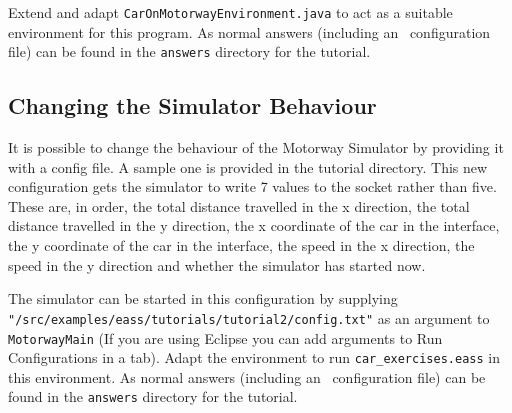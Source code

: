 Extend and adapt \texttt{CarOnMotorwayEnvironment.java} to act as a suitable environment for this program.  As normal answers (including an \ail\ configuration file) can be found in the \texttt{answers} directory for the tutorial.

\subsection{Changing the Simulator Behaviour}
It is possible to change the behaviour of the Motorway Simulator by providing it with a config file.  A sample one is provided in the tutorial directory.  This new configuration gets the simulator to write 7 values to the socket rather than five.  These are, in order, the total distance travelled in the x direction, the total distance travelled in the y direction, the x coordinate of the car in the interface, the y coordinate of the car in the interface, the speed in the x direction, the speed in the y direction and whether the simulator has started now.

\begin{sloppypar}
The simulator can be started in this configuration by supplying \texttt{"/src/examples/eass/tutorials/tutorial2/config.txt"} as an argument to \texttt{MotorwayMain} (If you are using Eclipse you can add arguments to Run Configurations in a tab).  Adapt the environment to run \texttt{car\_exercises.eass} in this environment.  As normal answers (including an \ail\ configuration file) can be found in the \texttt{answers} directory for the tutorial.
\end{sloppypar}
